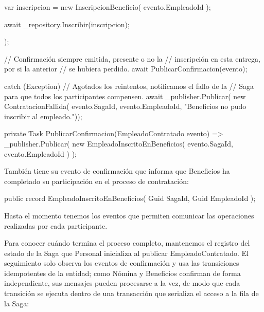 \documentclass[12pt, a4paper]{article}
\begin{document}
\begin{csharpbox}
{{{{                var inscripcion = new InscripcionBeneficio(
                    evento.EmpleadoId
                );

                await _repository.Inscribir(inscripcion);
            });

            // Confirmación siempre emitida, presente o no la
            // inscripción en esta entrega, por si la anterior
            // se hubiera perdido.
            await PublicarConfirmacion(evento);
        }
        catch (Exception)
        {
            // Agotados los reintentos, notificamos el fallo de la
            // Saga para que todos los participantes compensen.
            await _publisher.Publicar(
                new ContratacionFallida(
                    evento.SagaId,
                    evento.EmpleadoId,
                    "Beneficios no pudo inscribir al empleado."));
        }
    }

    private Task PublicarConfirmacion(EmpleadoContratado evento) =>
        _publisher.Publicar(
            new EmpleadoInscritoEnBeneficios(
                evento.SagaId,
                evento.EmpleadoId
            )
        );
}
    \end{csharpbox}

    También tiene su evento de confirmación que informa que Beneficios ha completado su participación en el proceso de contratación:

    \begin{csharpbox}
public record EmpleadoInscritoEnBeneficios(
    Guid SagaId,
    Guid EmpleadoId
);
    \end{csharpbox}

    Hasta el momento tenemos los eventos que permiten comunicar las operaciones realizadas por cada participante.

    Para conocer cuándo termina el proceso completo, mantenemos el registro del estado de la Saga que Personal inicializa al publicar EmpleadoContratado. El seguimiento solo observa los eventos de confirmación y usa las transiciones idempotentes de la entidad; como Nómina y Beneficios confirman de forma independiente, sus mensajes pueden procesarse a la vez, de modo que cada transición se ejecuta dentro de una transacción que serializa el acceso a la fila de la Saga:
\end{document}
